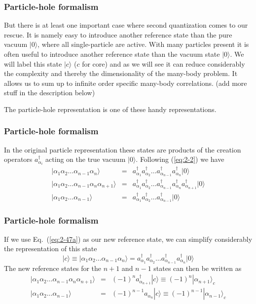 \documentclass[compress]{beamer}
\newcommand*{\ket}[1]{|#1\rangle}
\begin{document}
\frame
{
  \frametitle{Particle-hole formalism}
\begin{small}
{\scriptsize
But there is at least one important case where second quantization comes to our rescue.
It is namely easy to introduce another reference state than the pure vacuum $\ket{0}$, where all single-particle
are active.
With many particles present it is often useful to introduce another reference state  than the vacuum state 
$\ket{0}$. We will label this state $\ket{c}$ ($c$ for core) and as we will see it can reduce 
considerably the complexity and thereby the dimensionality of the many-body problem. It allows us to sum up to infinite order
specific many-body correlations. (add more stuff in the description below)

The particle-hole representation is one of these handy representations. 
}
\end{small}
}

\frame
{
  \frametitle{Particle-hole formalism}
\begin{small}
{\scriptsize
In the original particle representation these states are products of the creation operators  
$a_{\alpha_i}^\dagger$ acting on the true vacuum $\ket{0}$.
Following (\ref{eq:2-2}) we have 
\begin{eqnarray}
	\ket{\alpha_1\alpha_2\dots\alpha_{n-1}\alpha_n} &=& a_{\alpha_1}^\dagger a_{\alpha_2}^\dagger \dots
					a_{\alpha_{n-1}}^\dagger a_{\alpha_n}^\dagger \ket{0} \label{eq:2-47a} \\
	\ket{\alpha_1\alpha_2\dots\alpha_{n-1}\alpha_n\alpha_{n+1}} &=&
		a_{\alpha_1}^\dagger a_{\alpha_2}^\dagger \dots a_{\alpha_{n-1}}^\dagger a_{\alpha_n}^\dagger
		a_{\alpha_{n+1}}^\dagger \ket{0} \label{eq:2-47b} \\
	\ket{\alpha_1\alpha_2\dots\alpha_{n-1}} &=& a_{\alpha_1}^\dagger a_{\alpha_2}^\dagger \dots
		a_{\alpha_{n-1}}^\dagger \ket{0} \label{eq:2-47c}
\end{eqnarray}
}
\end{small}
}

\frame
{
  \frametitle{Particle-hole formalism}
\begin{small}
{\scriptsize
If we use Eq.~(\ref{eq:2-47a}) as our new reference state, we can simplify considerably the representation of 
this state
\begin{equation}
	\ket{c} \equiv \ket{\alpha_1\alpha_2\dots\alpha_{n-1}\alpha_n} =
		a_{\alpha_1}^\dagger a_{\alpha_2}^\dagger \dots a_{\alpha_{n-1}}^\dagger a_{\alpha_n}^\dagger \ket{0} \label{eq:2-48a}
\end{equation}
The new reference states for the $n+1$ and $n-1$ states can then be written as
\begin{eqnarray}
	\ket{\alpha_1\alpha_2\dots\alpha_{n-1}\alpha_n\alpha_{n+1}} &=& (-1)^n a_{\alpha_{n+1}}^\dagger \ket{c}
		\equiv (-1)^n \ket{\alpha_{n+1}}_c \label{eq:2-48b} \\
	\ket{\alpha_1\alpha_2\dots\alpha_{n-1}} &=& (-1)^{n-1} a_{\alpha_n} \ket{c} 
		\equiv (-1)^{n-1} \ket{\alpha_{n-1}}_c \label{eq:2-48c} 
\end{eqnarray}
}
\end{small}
}
\end{document}
